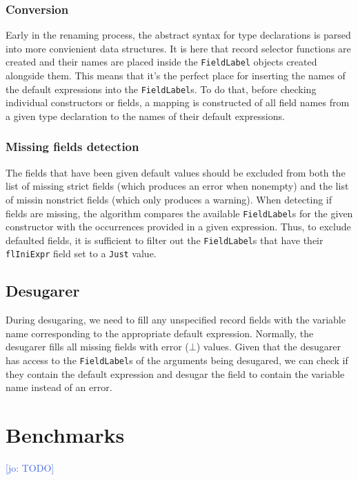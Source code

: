 \documentclass[en]{pracamgr}
\newcommand{\jcom}[1]{\textcolor{RoyalBlue}{[jo: #1]}}
\begin{document}
\subsection{Conversion}
Early in the renaming process, the abstract syntax for type declarations is parsed into more convienient data structures.
It is here that record selector functions are created and their names are placed inside the \texttt{FieldLabel} objects created alongside them.
This means that it's the perfect place for inserting the names of the default expressions into the \texttt{FieldLabel}s.
To do that, before checking individual constructors or fields, a mapping is constructed of all field names from a given type declaration to the names of their default expressions.
\subsection{Missing fields detection}
The fields that have been given default values should be excluded from both the list of missing strict fields (which produces an error when nonempty) and the list of missin nonstrict fields (which only produces a warning).
When detecting if fields are missing, the algorithm compares the available \texttt{FieldLabel}s for the given constructor with the occurrences provided in a given expression.
Thus, to exclude defaulted fields, it is sufficient to filter out the \texttt{FieldLabel}s that have their \texttt{flIniExpr} field set to a \texttt{Just} value.

\section{Desugarer}
During desugaring, we need to fill any unspecified record fields with the variable name corresponding to the appropriate default expression.
Normally, the desugarer fills all missing fields with error ($\bot$) values.
Given that the desugarer has access to the \texttt{FieldLabel}s of the arguments being desugared, we can check if they contain the default expression and desugar the field to contain the variable name instead of an error.


\chapter{Benchmarks}
\jcom{TODO}


 


\end{document}
